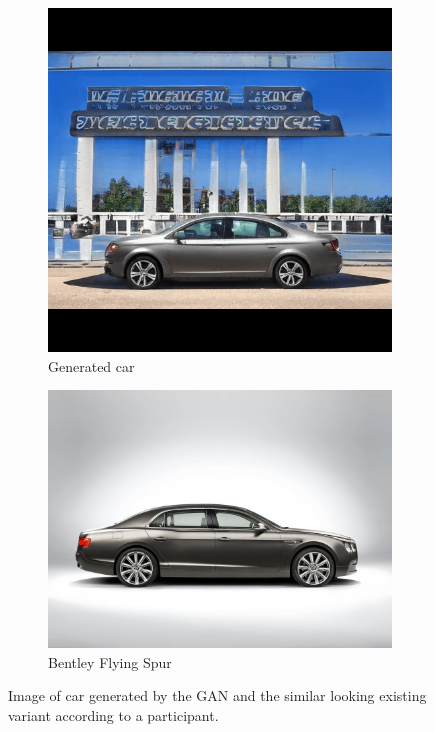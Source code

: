 \begin{figure}
\centering
\begin{subfigure}{.45\textwidth}
  \centering
  \includegraphics[width=\textwidth]{images/text.png}
  \caption{Generated car}
  \label{fig:similarcar_gan}
\end{subfigure}%
\hspace{.02\textwidth}
\begin{subfigure}{.45\textwidth}
  \centering
  \includegraphics[width=\textwidth]{images/bentley-flying-spur.jpg}
  \caption{Bentley Flying Spur}
  \label{fig:similarcar_real}
\end{subfigure}
\captionsetup{width=.85\linewidth}
\captionsetup{justification=centering}
\caption{ Image of car generated by the GAN and the similar looking existing variant according to a participant. }
\label{fig:similarcar}
\end{figure}

